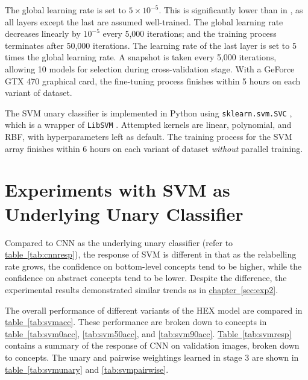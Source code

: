 \documentclass[11pt,a4paper]{book}
\begin{document}
The global learning rate is set to $5\times10^{-5}$. This is significantly lower than in \cite{krizhevsky2012imagenet}, as all layers except the last are assumed well-trained. The global learning rate decreases linearly by $10^{-5}$ every 5,000 iterations; and the training process terminates after 50,000 iterations. The learning rate of the last layer is set to 5 times the global learning rate. A snapshot is taken every 5,000 iterations, allowing 10 models for selection during cross-validation stage. With a GeForce GTX 470 graphical card, the fine-tuning process finishes within 5 hours on each variant of dataset.

The SVM unary classifier is implemented in Python using \texttt{sklearn.svm.SVC} \cite{sklearn}, which is a wrapper of \texttt{LibSVM} \cite{libsvm}. Attempted kernels are linear, polynomial, and RBF, with hyperparameters left as default. The training process for the SVM array finishes within 6 hours on each variant of dataset \emph{without} parallel training.

\section{Experiments with SVM as Underlying Unary Classifier}
\label{sec:svm}

Compared to CNN as the underlying unary classifier (refer to \hyperref[tab:cnnresp]{table~\ref{tab:cnnresp}}), the response of SVM is different in that as the relabelling rate grows, the confidence on bottom-level concepts tend to be higher, while the confidence on abstract concepts tend to be lower. Despite the difference, the experimental results demonstrated similar trends as in \hyperref[sec:exp2]{chapter~\ref{sec:exp2}}.

The overall performance of different variants of the HEX model are compared in \hyperref[tab:svmacc]{table~\ref{tab:svmacc}}. These performance are broken down to concepts in \hyperref[tab:svm0acc]{table~\ref{tab:svm0acc}}, \ref{tab:svm50acc}, and \ref{tab:svm90acc}. \hyperref[tab:svmresp]{Table~\ref{tab:svmresp}} contains a summary of the response of CNN on validation images, broken down to concepts. The unary and pairwise weightings learned in stage 3 are shown in \hyperref[tab:svmunary]{table~\ref{tab:svmunary}} and \ref{tab:svmpairwise}.
\end{document}
